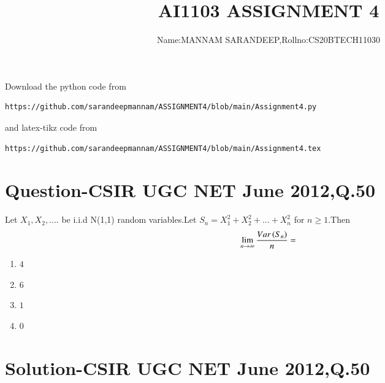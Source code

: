 \documentclass[journal,12pt,twocolumn]{IEEEtran}
\begin{document}
     \def\rightbox#1{\makebox[0in][r]{#1}}
     \def\centbox#1{\makebox[0in]{#1}}
     \def\topbox#1{\raisebox{-\baselineskip}[0in][0in]{#1}}
     \def\midbox#1{\raisebox{-0.5\baselineskip}[0in][0in]{#1}}
\vspace{3cm}
\title{AI1103 ASSIGNMENT 4}
\author{Name:MANNAM SARANDEEP,Rollno:CS20BTECH11030}
\maketitle
\newpage
\bigskip
\renewcommand{\thefigure}{\theenumi}
\renewcommand{\thetable}{\theenumi}
\newcommand{\dsum}{\displaystyle\sum}
\newcommand{\R}{\mathbb{R}}
\newcommand{\C}{\mathbb{C}}


Download the python code from 
\begin{lstlisting}
https://github.com/sarandeepmannam/ASSIGNMENT4/blob/main/Assignment4.py
\end{lstlisting}
%
and latex-tikz code from 
%
\begin{lstlisting}
https://github.com/sarandeepmannam/ASSIGNMENT4/blob/main/Assignment4.tex
\end{lstlisting}
\section{Question-CSIR UGC NET June 2012,Q.50}
Let $X_{1},X_{2},....$ be i.i.d N(1,1) random variables.Let $S_{n}=X_{1}^{2}+X_{2}^2+...+X_{n}^{2}$ for $n\ge1$.Then $$\lim_{n \to \infty}{\frac{Var\left(S_{n}\right)}{n}}=$$
\begin{enumerate}[label = (\Alph*)]
\item  $4$
\item  $6$
\item  $1$
\item  $0$
\end{enumerate}

\section{Solution-CSIR UGC NET June 2012,Q.50}
\end{document}
